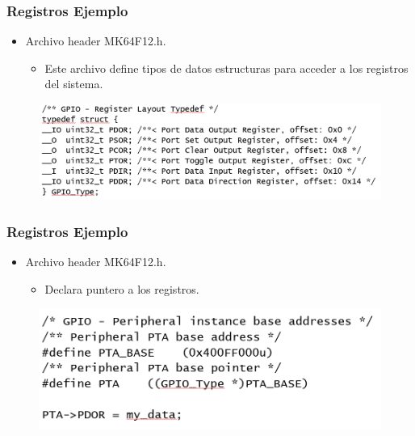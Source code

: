 \documentclass[10.5pt,scale=1.0,t,aspectratio=169,hyperref={pdfpagelabels=false}]{beamer}
\begin{document}
\begin{frame}
	\frametitle{Registros Ejemplo}
	\begin{itemize}
		\item Archivo header MK64F12.h. 
		\begin{itemize}
			\item Este archivo define tipos de datos estructuras para acceder a los registros del sistema.
		\end{itemize} 
	\end{itemize}
	\begin{figure}
		\centering
		\includegraphics[scale=0.5]{GPIOStruct}
	\end{figure}
\end{frame}
\begin{frame}
	\frametitle{Registros Ejemplo}
	\begin{itemize}
		\item Archivo header MK64F12.h. 
		\begin{itemize}
			\item Declara puntero a los registros. 
		\end{itemize} 
	\end{itemize}
	\begin{figure}
		\centering
		\includegraphics[scale=0.5]{GPIOPointer}
	\end{figure}
\end{frame}
\frame{
\begin{center}
	\LARGE \textcolor{blue}{INTRODUCCIÓN A LOS MICROCONTROLADORES}
\end{center}

\begin{center}
	\LARGE \textcolor{blue}{GRACIAS}
\end{center}
}

\end{document}
